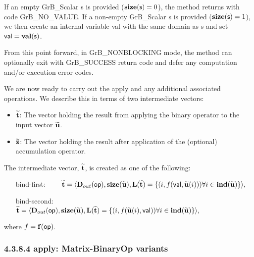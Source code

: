 {\color{red}
If an empty {\sf GrB\_Scalar} {\sf s} is provided ($\mathbf{size}({\sf s}) = 0$),
the method returns with code {\sf GrB\_NO\_VALUE}. If a non-empty {\sf GrB\_Scalar} {\sf s} is provided ($\mathbf{size}({\sf s}) = 1$),
we then create an internal variable {\sf val} with the same domain as {\sf s} and set ${\sf val} = \mathbf{val}({\sf s})$.
}

From this point forward, in {\sf GrB\_NONBLOCKING} mode, the method can 
optionally exit with {\sf GrB\_SUCCESS} return code and defer any computation 
and/or execution error codes.

We are now ready to carry out the apply and any additional 
associated operations.  We describe this in terms of two intermediate vectors:
\begin{itemize}
    \item ${\bf \widetilde{t}}$: The vector holding the result from applying the binary operator to the input vector
    ${\bf \widetilde{u}}$.
    \item ${\bf \widetilde{z}}$: The vector holding the result after 
    application of the (optional) accumulation operator.
\end{itemize}

The intermediate vector, ${\bf \widetilde{t}}$, is created as one of the following:
\begin{itemize}[leftmargin=1.5in]
\item[bind-first:~~~~]
${\bf \widetilde{t}} = \langle
\mbox{$\mathbf{D}_{out}$}({\sf op}), \bold{size}({\bf \widetilde{u}}),
\bold{L}({\bf \widetilde{t}}) =
\{(i,f({\sf val},{\bf \widetilde{u}}(i))) \forall i \in \bold{ind}({\bf \widetilde{u}}) \} \rangle,$

\item[bind-second:~~~~]
${\bf \widetilde{t}} = \langle
\mbox{$\mathbf{D}_{out}$}({\sf op}), \bold{size}({\bf \widetilde{u}}),
\bold{L}({\bf \widetilde{t}}) =
\{(i,f({\bf \widetilde{u}}(i),{\sf val})) \forall i \in \bold{ind}({\bf \widetilde{u}}) \} \rangle,$
\end{itemize}
where $f = \mathbf{f}({\sf op})$.







\subsubsection*{4.3.8.4 {\sf apply}: Matrix-BinaryOp variants}

